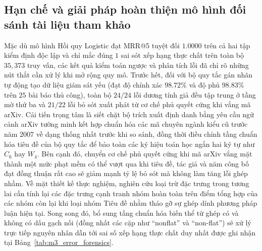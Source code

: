 \subsection{Hạn chế và giải pháp hoàn thiện mô hình đối sánh tài liệu tham khảo}

Mặc dù mô hình Hồi quy Logistic đạt MRR@5 tuyệt đối $1.0000$ trên cả hai tập kiểm định độc lập và chỉ mắc đúng $1$ sai sót xếp hạng thực chất trên toàn bộ $35{,}373$ truy vấn, các kết quả kiểm toán ngược và phân tích lỗi đã chỉ rõ những nút thắt cần xử lý khi mở rộng quy mô. Trước hết, đối với bộ quy tắc gán nhãn tự động tạo dữ liệu giám sát yếu (đạt độ chính xác $98.72\%$ và độ phủ $98.83\%$ trên $25$ bài báo thủ công), toàn bộ $24/24$ lỗi dương tính giả đều tập trung ở tầng mờ thứ ba và $21/22$ lỗi bỏ sót xuất phát từ cơ chế phủ quyết cứng khi vắng mã arXiv. Cải tiến trọng tâm là siết chặt bộ trích xuất định danh bằng yêu cầu ngữ cảnh arXiv tường minh kết hợp chuẩn hóa các mã chuyên ngành kiểu cũ trước năm $2007$ về dạng thống nhất trước khi so sánh, đồng thời điều chỉnh tầng chuẩn hóa tiêu đề của bộ quy tắc để bảo toàn các ký hiệu toán học ngắn hai ký tự như $C_6$ hay $W_4$. Bên cạnh đó, chuyển cơ chế phủ quyết cứng khi mã arXiv vắng mặt thành một mức phạt mềm có thể vượt qua khi tiêu đề, tác giả và năm công bố đạt đồng thuận rất cao sẽ giảm mạnh tỷ lệ bỏ sót mà không làm tăng lỗi ghép nhầm. Về mặt thiết kế thực nghiệm, nghiên cứu loại trừ đặc trưng trong tương lai cần tính lại các đặc trưng cạnh tranh nhóm hoàn toàn trên điểm tổng hợp của các nhóm còn lại khi loại nhóm Tiêu đề nhằm tháo gỡ sự ghép dính phương pháp luận hiện tại. Song song đó, bổ sung tầng chuẩn hóa biến thể từ ghép có và không có dấu gạch nối (đồng nhất các cặp như ``nonflat'' và ``non-flat'') sẽ xử lý trực tiếp nguyên nhân dẫn tới sai số xếp hạng thực chất duy nhất được ghi nhận tại Bảng~\ref{tab:m3_error_forensics}.

